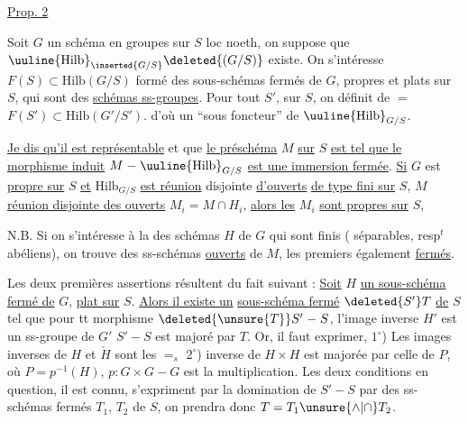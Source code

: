 \uline{Prop. 2}

Soit $G$ un schéma en groupes sur $S$ loc noeth,
on suppose que $\text{\uuline{Hilb}}_{\inserted{G/S}}\deleted{(G/S)}$ existe. On s'intéresse
 $F(S)\subset\mathrm{Hilb}(G/S)$ formé des
sous-schémas fermés de $G$, propres et plats sur $S$,
qui sont des \uline{schémas  ss-groupes}. Pour tout
$S'$, sur $S$, on définit de $=$ $F(S')\subset\mathrm{Hilb}(G'/S')$.
d'où un ``sous foncteur'' de $\text{\uuline{Hilb}}_{G/S}$.

\uline{Je dis qu'il est représentable} et que
\uline{le préschéma} $M$ \uline{sur} $S$ \uline{est tel que le
morphisme induit} $M\mathrel{-}\text{\uuline{Hilb}}_{G/S}$ \uline{est
une immersion fermée}. \uline{Si} $G$ est
\uline{propre sur} $S$ \uline{et} $\mathrm{Hilb}_{G/S}$ \uline{est réunion} disjointe
\uline{d'ouverts}  \uline{de type fini  sur} $S$,
  $M$ 
\uline{réunion disjointe des ouverts} $M_i=M\cap H_i$,
\uline{alors les} $M_i$ \uline{sont propres sur} $S$,

N.B. Si on s'intéresse à la  des  schémas  $H$
de $G$ qui sont  finis ( séparables, resp$^t$ abéliens),
on trouve des ss-schémas \uline{ouverts} de $M$, les premiers
 également \uline{fermés}.

Les deux premières assertions résultent
du fait suivant : \uline{Soit} $H$ \uline{un sous-schéma
fermé de} $G$,  \uline{plat sur} $S$. \uline{Alors il existe un}
 \uline{sous-schéma fermé} $\deleted{S'}T$ \uline{de} $S$
tel que pour tt morphisme $\deleted{\unsure{T}}S'\mathrel{-}S$,
l'image inverse $H'$ est un ss-groupe de $G'$
 $S'\mathrel{-}S$ est majoré par $T$. Or,
il faut exprimer,  $1^\circ$) Les images
inverses de $H$ et $\check H$ sont les ${=}_{s}$
$2^\circ$)  inverse de $H\times H$ est
majorée par celle de $P$, où
$P=p^{-1}(H)$, $p:G\times G\mathrel{-}G$ est la
multiplication. Les deux  conditions
en question, il est connu, s'expriment
par la  domination de $S'\mathrel{-}S$ par
des ss-schémas fermés $T_1$, $T_2$ de $S$,
on prendra donc $T=T_1\unsure{\wedge|\cap} T_2$.

